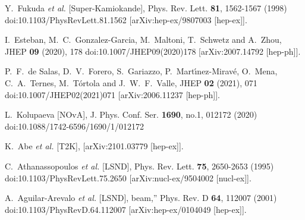 \begin{thebibliography}{00}




Y.~Fukuda \textit{et al.} [Super-Kamiokande],
Phys. Rev. Lett. \textbf{81}, 1562-1567 (1998)
doi:10.1103/PhysRevLett.81.1562
[arXiv:hep-ex/9807003 [hep-ex]].

I.~Esteban, M.~C.~Gonzalez-Garcia, M.~Maltoni, T.~Schwetz and A.~Zhou,
JHEP \textbf{09} (2020), 178
doi:10.1007/JHEP09(2020)178
[arXiv:2007.14792 [hep-ph]].  

P.~F.~de Salas, D.~V.~Forero, S.~Gariazzo, P.~Mart\'\i{}nez-Mirav\'e, O.~Mena, C.~A.~Ternes, M.~T\'ortola and J.~W.~F.~Valle,
JHEP \textbf{02} (2021), 071
doi:10.1007/JHEP02(2021)071
[arXiv:2006.11237 [hep-ph]].

L.~Kolupaeva [NOvA],
J. Phys. Conf. Ser. \textbf{1690}, no.1, 012172 (2020)
doi:10.1088/1742-6596/1690/1/012172

K.~Abe \textit{et al.} [T2K],
[arXiv:2101.03779 [hep-ex]].


C.~Athanassopoulos \textit{et al.} [LSND],
Phys. Rev. Lett. \textbf{75}, 2650-2653 (1995)
doi:10.1103/PhysRevLett.75.2650
[arXiv:nucl-ex/9504002 [nucl-ex]].

A.~Aguilar-Arevalo \textit{et al.} [LSND],
 beam,''
Phys. Rev. D \textbf{64}, 112007 (2001)
doi:10.1103/PhysRevD.64.112007
[arXiv:hep-ex/0104049 [hep-ex]].


\end{thebibliography}
